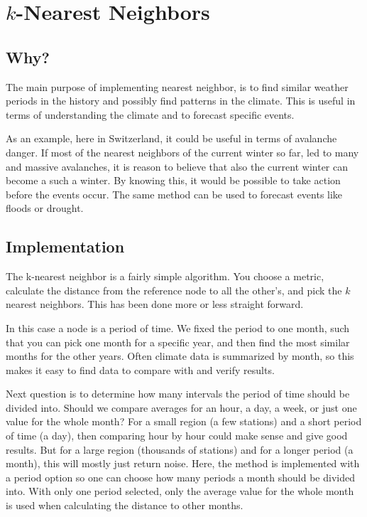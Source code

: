 \section{$k$-Nearest Neighbors}

\subsection{Why?} %

The main purpose of implementing nearest neighbor, is to find similar weather
periods in the history and possibly find patterns in the climate. This is useful
in terms of understanding the climate and to forecast specific events. 

As an example, here in Switzerland, it could be useful in terms of avalanche
danger. If most of the nearest neighbors of the current winter so far, led to
many and massive avalanches, it is reason to believe that also the current
winter can become a such a winter. By knowing this, it would be possible to take
action before the events occur. The same method can be used to forecast events
like floods or drought.  



\subsection{Implementation} %

The k-nearest neighbor is a fairly simple algorithm. You choose a metric,
calculate the distance from the reference node to all the other's, and pick the
$k$ nearest neighbors. This has been done more or less straight forward.

In this case a node is a period of time. We fixed the period to one month, such
that you can pick one month for a specific year, and then find the most similar
months for the other years. Often climate data is summarized by month, so this
makes it easy to find data to compare with and verify results.

Next question is to determine how many intervals the period of time should be
divided into. Should we compare averages for an hour, a day, a week, or just one
value for the whole month? For a small region (a few stations) and a short
period of time (a day), then comparing hour by hour could make sense and give
good results. But for a large region (thousands of stations) and for a longer
period (a month), this will mostly just return noise. Here, the method is
implemented with a period option so one can choose how many periods a month
should be divided into. With only one period selected, only the average value
for the whole month is used when calculating the distance to other months.

